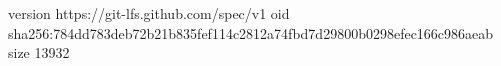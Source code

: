 version https://git-lfs.github.com/spec/v1
oid sha256:784dd783deb72b21b835fef114c2812a74fbd7d29800b0298efec166c986aeab
size 13932
